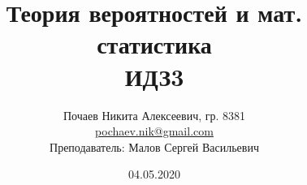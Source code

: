 

\title{Теория вероятностей и мат. статистика \\ ИДЗ3}
\date{04.05.2020}
\author{Почаев Никита Алексеевич, гр. 8381 \\ \href{mailto:pochaev.nik@gmail.com}{pochaev.nik@gmail.com} \\ Преподаватель: Малов Сергей Васильевич}


	
\renewcommand{\figurename}{Рисунок}

\maketitle

\begin{figure}[H]
\end{figure}
	
